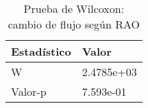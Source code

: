 \begin{table}[ht]
\centering
\caption{Prueba de Wilcoxon: cambio de flujo según RAO} 
\label{tab:prueba_w_rao_flujo}
\begin{tabular}{ll}
  \hline
Estadístico & Valor \\ 
  \hline
W & 2.4785e+03 \\ 
  Valor-p & 7.593e-01 \\ 
   \hline
\end{tabular}
\end{table}
